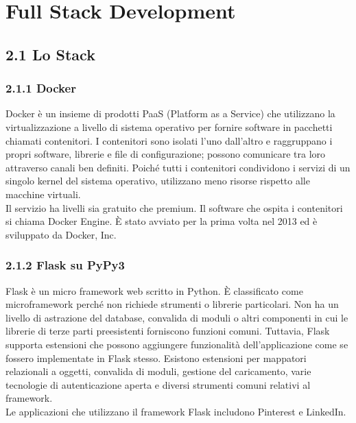 \chapter{Full Stack Development} %


\section*{2.1 \hspace{1cm} Lo Stack}
\subsection*{2.1.1 \hspace{1cm} Docker}
Docker è un insieme di prodotti PaaS (Platform as a Service) che utilizzano la virtualizzazione a livello di sistema operativo per fornire software in pacchetti chiamati contenitori. I contenitori sono isolati l'uno dall'altro e raggruppano i propri software, librerie e file di configurazione; possono comunicare tra loro attraverso canali ben definiti. Poiché tutti i contenitori condividono i servizi di un singolo kernel del sistema operativo, utilizzano meno risorse rispetto alle macchine virtuali. \\

Il servizio ha livelli sia gratuito che premium. Il software che ospita i contenitori si chiama Docker Engine. È stato avviato per la prima volta nel 2013 ed è sviluppato da Docker, Inc.

\subsection*{2.1.2 \hspace{1cm} Flask su PyPy3}
Flask è un micro framework web scritto in Python. È classificato come microframework perché non richiede strumenti o librerie particolari. Non ha un livello di astrazione del database, convalida di moduli o altri componenti in cui le librerie di terze parti preesistenti forniscono funzioni comuni. Tuttavia, Flask supporta estensioni che possono aggiungere funzionalità dell'applicazione come se fossero implementate in Flask stesso. Esistono estensioni per mappatori relazionali a oggetti, convalida di moduli, gestione del caricamento, varie tecnologie di autenticazione aperta e diversi strumenti comuni relativi al framework. \\

Le applicazioni che utilizzano il framework Flask includono Pinterest e LinkedIn. \\

